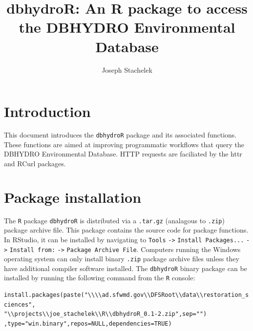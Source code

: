 \documentclass[12pt,notitlepage]{article}
\author{Joseph Stachelek}
\title{dbhydroR: An R package to access the DBHYDRO Environmental Database}
\begin{document}

\maketitle
 


\section{Introduction}

This document introduces the \texttt{dbhydroR} package and its associated functions. These functions are aimed at improving programmatic workflows that query the DBHYDRO Environmental Database. HTTP requests are faciliated by the httr \citep{httr} and RCurl \citep{rcurl} packages. 

\section{Package installation}

The \texttt{R} package \texttt{dbhydroR} is distributed via a \texttt{.tar.gz} (analagous to \texttt{.zip}) package archive file. This package contains the source code for package functions. In RStudio, it can be installed by navigating to \texttt{Tools} \verb|->| \texttt{Install Packages...} \verb|->| \texttt{Install from:} \verb|->| \texttt{Package Archive File}. Computers running the Windows operating system can only install binary \texttt{.zip} package archive files unless they have additional compiler software installed. The \texttt{dbhydroR} binary package can be installed by running the following command from the \texttt{R} console:

\vspace{10pt}
\noindent\texttt{install.packages(paste(}\verb|"\\\\ad.sfwmd.gov\\DFSRoot\\data\\restoration_sciences",|\\
\verb|"\\projects\\joe_stachelek\\R\\dbhydroR_0.1-2.zip",sep="")|\\
\texttt{,type="win.binary",repos=NULL,dependencies=TRUE)}

\vspace{8pt}
\end{document}
